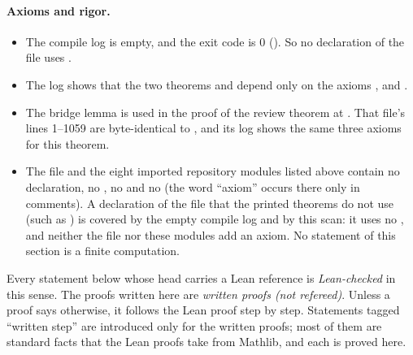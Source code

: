 \paragraph{Axioms and rigor.}
\begin{itemize}
\item The compile log  is empty, and the exit code is 0
  (). So no declaration of the file uses .
\item The log  shows that the two theorems
   and  depend only on the axioms
  ,  and .
\item The bridge lemma  is used in the proof of the review theorem
   at . That file's lines 1--1059
  are byte-identical to , and its log  shows
  the same three axioms for this theorem.
\item The file and the eight imported repository modules listed above contain no  declaration, no
  , no  and no  (the word ``axiom'' occurs there only in comments). A
  declaration of the file that the printed theorems do not use (such as
  ) is covered by the empty compile log and by this scan: it uses no , and
  neither the file nor these modules add an axiom. No statement of this section is a finite computation.
\end{itemize}

Every statement below whose head carries a Lean reference is \emph{Lean-checked} in this sense. The proofs written here
are \emph{written proofs (not refereed)}. Unless a proof says otherwise, it follows the Lean proof step by step.
Statements tagged ``written step'' are introduced only for the written proofs; most of them are standard facts that
the Lean proofs take from Mathlib, and each is proved here.

